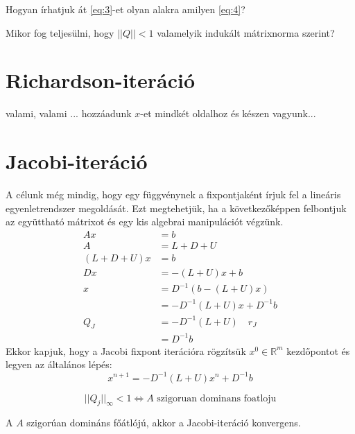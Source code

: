 \begin{kerdes}
    Hogyan írhatjuk át \ref{eq:3}-et olyan alakra amilyen \ref{eq:4}?
\end{kerdes}
\begin{kerdes}
    Mikor fog teljesülni, hogy $\lvert\lvert Q \rvert\rvert < 1$ valamelyik indukált mátrixnorma szerint?
\end{kerdes}

\section{Richardson-iteráció}
valami, valami ... hozzáadunk $x$-et mindkét oldalhoz és készen vagyunk...

\section{Jacobi-iteráció}
A célunk még mindig, hogy egy függvénynek a fixpontjaként írjuk fel a lineáris egyenletrendszer megoldását. Ezt megtehetjük, ha a következőképpen felbontjuk az együttható mátrixot és egy kis algebrai manipulációt végzünk.
\begin{align*}
    Ax & = b \\
    A & = L + D + U \\
    (L + D + U)x & = b \\
    Dx & = -(L+U)x + b \\
    x & = D^{-1}(b - (L+U)x) \\
    & = -D^{-1}(L+U)x + D^{-1}b \\
    Q_{J} & = -D^{-1}(L+U) \quad r_{J} \\
    & = D^{-1}b
\end{align*}
Ekkor kapjuk, hogy a Jacobi fixpont iterációra rögzítsük $x^{0} \in \mathbb{R}^{m}$ kezdőpontot és legyen az általános lépés:
\begin{equation*}
    x^{n+1} = -D^{-1}(L+U)x^{n} + D^{-1}b
\end{equation*}

\begin{allitas}
    \begin{equation*}
        \lvert\lvert Q_{j} \rvert\rvert_{\infty} < 1 \iff A \text{ szigoruan dominans foatloju}
    \end{equation*}
\end{allitas}

\begin{kov}
    A $A$ szigorúan domináns főátlójú, akkor a Jacobi-iteráció konvergens.
\end{kov}

